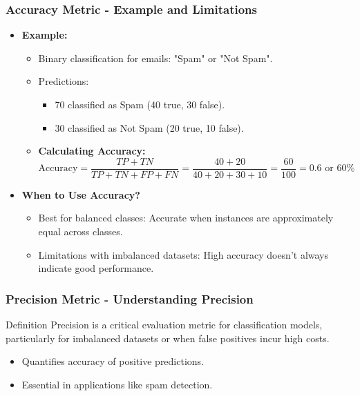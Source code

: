 \documentclass[aspectratio=169]{beamer}
\begin{document}
\begin{frame}[fragile]
    \frametitle{Accuracy Metric - Example and Limitations}
    \begin{itemize}
        \item \textbf{Example:}
        \begin{itemize}
            \item Binary classification for emails: "Spam" or "Not Spam".
            \item Predictions:
                \begin{itemize}
                    \item 70 classified as Spam (40 true, 30 false).
                    \item 30 classified as Not Spam (20 true, 10 false).
                \end{itemize}
            \item \textbf{Calculating Accuracy:}
            \[
            \text{Accuracy} = \frac{TP + TN}{TP + TN + FP + FN} = \frac{40 + 20}{40 + 20 + 30 + 10} = \frac{60}{100} = 0.6 \text{ or } 60\%
            \]
        \end{itemize}
        
        \item \textbf{When to Use Accuracy?}
        \begin{itemize}
            \item Best for balanced classes: Accurate when instances are approximately equal across classes.
            \item Limitations with imbalanced datasets: High accuracy doesn't always indicate good performance.
        \end{itemize}
    \end{itemize}
\end{frame}

\begin{frame}[fragile]
    \frametitle{Precision Metric - Understanding Precision}
    \begin{block}{Definition}
        Precision is a critical evaluation metric for classification models, particularly for imbalanced datasets or when false positives incur high costs.
    \end{block}
    
    \begin{itemize}
        \item Quantifies accuracy of positive predictions.
        \item Essential in applications like spam detection.
    \end{itemize}
\end{frame}
\end{document}

